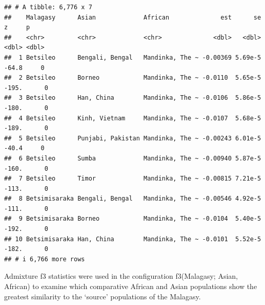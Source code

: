 \documentclass[
]{article}
\newenvironment{Shaded}{\begin{snugshade}}{\end{snugshade}}
\newcommand{\AttributeTok}[1]{\textcolor[rgb]{0.13,0.29,0.53}{#1}}
\newcommand{\ControlFlowTok}[1]{\textcolor[rgb]{0.13,0.29,0.53}{\textbf{#1}}}
\newcommand{\FunctionTok}[1]{\textcolor[rgb]{0.13,0.29,0.53}{\textbf{#1}}}
\newcommand{\NormalTok}[1]{#1}
\newcommand{\OtherTok}[1]{\textcolor[rgb]{0.56,0.35,0.01}{#1}}
\newcommand{\SpecialCharTok}[1]{\textcolor[rgb]{0.81,0.36,0.00}{\textbf{#1}}}
\newcommand{\StringTok}[1]{\textcolor[rgb]{0.31,0.60,0.02}{#1}}
\begin{document}
\begin{Shaded}
\end{Shaded}

\begin{verbatim}
## # A tibble: 6,776 x 7
##    Malagasy      Asian             African              est      se      z     p
##    <chr>         <chr>             <chr>              <dbl>   <dbl>  <dbl> <dbl>
##  1 Betsileo      Bengali, Bengal   Mandinka, The ~ -0.00369 5.69e-5  -64.8     0
##  2 Betsileo      Borneo            Mandinka, The ~ -0.0110  5.65e-5 -195.      0
##  3 Betsileo      Han, China        Mandinka, The ~ -0.0106  5.86e-5 -180.      0
##  4 Betsileo      Kinh, Vietnam     Mandinka, The ~ -0.0107  5.68e-5 -189.      0
##  5 Betsileo      Punjabi, Pakistan Mandinka, The ~ -0.00243 6.01e-5  -40.4     0
##  6 Betsileo      Sumba             Mandinka, The ~ -0.00940 5.87e-5 -160.      0
##  7 Betsileo      Timor             Mandinka, The ~ -0.00815 7.21e-5 -113.      0
##  8 Betsimisaraka Bengali, Bengal   Mandinka, The ~ -0.00546 4.92e-5 -111.      0
##  9 Betsimisaraka Borneo            Mandinka, The ~ -0.0104  5.40e-5 -192.      0
## 10 Betsimisaraka Han, China        Mandinka, The ~ -0.0101  5.52e-5 -182.      0
## # i 6,766 more rows
\end{verbatim}

Admixture f3 statistics were used in the configuration f3(Malagasy;
Asian, African) to examine which comparative African and Asian
populations show the greatest similarity to the `source' populations of
the Malagasy.
\end{document}
